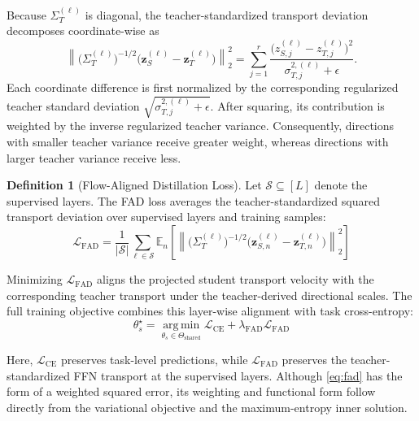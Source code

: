\documentclass[letterpaper]{article} %
\newcommand{\E}{\mathbb{E}}
\newcommand{\calL}{\mathcal{L}}
\newcommand{\calS}{\mathcal{S}}
\newcommand{\FAD}{\mathrm{FAD}}
\newcommand{\CE}{\mathrm{CE}}
\newcommand{\bz}{\boldsymbol{z}}
\newcommand{\bSigma}{\varSigma}
\theoremstyle{plain}
\theoremstyle{definition}
\newtheorem{definition}{Definition}
\begin{document}
Because $\bSigma_T^{(\ell)}$ is diagonal, the teacher-standardized
transport deviation decomposes coordinate-wise as
\begin{equation}
  \left\|
    \bigl(
      \bSigma_T^{(\ell)}
    \bigr)^{-1/2}
    \bigl(
      \bz_S^{(\ell)}
      -
      \bz_T^{(\ell)}
    \bigr)
  \right\|_2^2
  =
  \sum_{j=1}^{r}
  \frac{
    \bigl(
      z_{S,j}^{(\ell)}
      -
      z_{T,j}^{(\ell)}
    \bigr)^2
  }{
    \sigma_{T,j}^{2,(\ell)}
    +
    \epsilon
  }.
  \label{eq:directional-standardization}
\end{equation}
Each coordinate difference is first normalized by the corresponding regularized teacher standard deviation $\sqrt{\sigma_{T,j}^{2,(\ell)}+\epsilon}$. After squaring, its contribution is weighted by the inverse regularized teacher variance. Consequently, directions with smaller teacher variance receive greater weight, whereas directions with larger teacher variance receive less.

\begin{definition}[Flow-Aligned Distillation Loss]
Let $\calS\subseteq[L]$ denote the supervised layers. The FAD loss averages the teacher-standardized squared transport deviation over supervised layers and training samples:
\begin{equation}
  \calL_{\FAD}
  =
  \frac{1}{|\calS|}
  \sum_{\ell\in\calS}
  \E_n\!\left[
    \left\|
      \bigl(
        \bSigma_T^{(\ell)}
      \bigr)^{-1/2}
      \bigl(
        \bz_{S,n}^{(\ell)}
        -
        \bz_{T,n}^{(\ell)}
      \bigr)
    \right\|_2^2
  \right]
\label{eq:fad}
\end{equation}
\end{definition}

Minimizing $\calL_{\FAD}$ aligns the projected student transport velocity with the corresponding teacher transport under the teacher-derived directional scales. The full training objective combines this layer-wise alignment with task cross-entropy:
\begin{equation}
  \theta_s^\star
  =
  \operatorname*{arg\,min}_{\theta_s\in\Theta_{\mathrm{shared}}}
  \calL_{\CE}
  +
  \lambda_{\FAD}\calL_{\FAD}
\label{eq:objective}
\end{equation}

Here, $\calL_{\CE}$ preserves task-level predictions, while
$\calL_{\FAD}$ preserves the teacher-standardized FFN transport at the supervised layers. Although \eqref{eq:fad} has the form of a weighted squared error, its weighting and functional form follow directly from the variational objective and the maximum-entropy inner solution.
\end{document}
